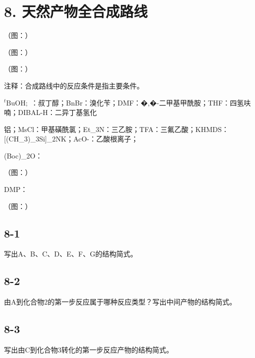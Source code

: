 \section*{8. 天然产物全合成路线}
（图：）

（图：）

（图：）

注释：合成路线中的反应条件是指主要条件。

$^ { t } \mathrm { { B u O H } \mathrm { { ; } } }$ ：叔丁醇；BnBr：溴化苄；DMF：�,�-⼆甲基甲酰胺；THF：四氢呋喃；DIBAL-H：⼆异丁基氢化

铝；MsCl：甲基磺酰氯；Et_{3}N：三⼄胺；TFA：三氟⼄酸；KHMDS：[(CH_{3})_{3}Si]_{2}NK；AcO-：⼄酸根离⼦；

(Boc)_{2}O：

（图：）

DMP：

（图：）

\subsection*{8-1}
写出A、B、C、D、E、F、G的结构简式。

\subsection*{8-2}
由A到化合物2的第⼀步反应属于哪种反应类型？写出中间产物的结构简式。

\subsection*{8-3}
写出由C到化合物3转化的第⼀步反应产物的结构简式。
